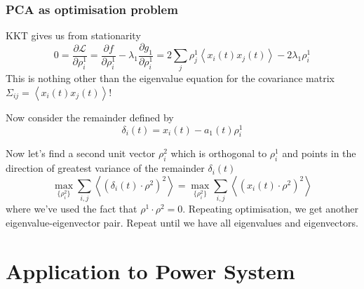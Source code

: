 \documentclass[10pt,aspectratio=169,dvipsnames]{beamer}
\def\d{\partial}
\begin{document}
\begin{frame}
  \frametitle{PCA as optimisation problem}

  KKT gives us from stationarity
  \begin{equation*}
    0 = \frac{\d \mathcal{L}}{\d \rho^1_i} = \frac{\d f}{\d \rho^1_i} - \lambda_1 \frac{\d g_1}{\d \rho^1_i} = 2\sum_j \rho^1_j \left\langle x_i(t)x_j(t) \right\rangle - 2\lambda_1 \rho^1_i
  \end{equation*}
  This is nothing other than the eigenvalue equation for the covariance matrix $\Sigma_{ij} = \left\langle x_i(t)x_j(t) \right\rangle$!

  Now consider the remainder defined by
  \begin{equation*}
    \delta_i(t) = x_i(t) - a_1(t) \rho^1_i
  \end{equation*}

  Now let's find a second unit vector $\rho^2_i$ which is orthogonal to $\rho^1_i$ and points in the direction of greatest variance of the remainder $\delta_i(t)$
  \begin{equation*}
    \max_{\{\rho_i^2\}} \sum_{i,j} \left\langle (\delta_i (t) \cdot \rho^2)^2 \right\rangle =     \max_{\{\rho_i^2\}} \sum_{i,j} \left\langle (x_i (t) \cdot \rho^2)^2 \right\rangle
  \end{equation*}
  where we've used the fact that $\rho^1 \cdot \rho^2 = 0$. Repeating optimisation, we get another eigenvalue-eigenvector pair. Repeat until we have all eigenvalues and eigenvectors.

\end{frame}




\section{Application to Power System}
\end{document}
